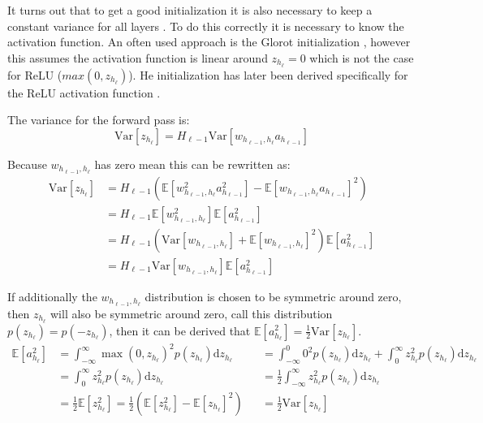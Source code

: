 It turns out that to get a good initialization it is also necessary to keep a constant variance for all layers \cite{glorot-initialization, he-initialization}. To do this correctly it is necessary to know the activation function. An often used approach is the Glorot initialization \cite{glorot-initialization}, however this assumes the activation function is linear around $z_{h_\ell} = 0$ which is not the case for ReLU ($max(0, z_{h_{\ell}})$). He initialization has later been derived specifically for the ReLU activation function \cite{he-initialization}.

The variance for the forward pass is:
\begin{equation}
\mathrm{Var}[z_{h_\ell}] = H_{\ell-1} \mathrm{Var}[w_{h_{\ell-1}, h_{\ell}} a_{h_{\ell-1}}]
\end{equation}

Because $w_{h_{\ell-1}, h_{\ell}}$ has zero mean this can be rewritten as:
\begin{equation}
\begin{aligned}
\mathrm{Var}[z_{h_\ell}]
&= H_{\ell-1} \left( \mathbb{E}[w_{h_{\ell-1}, h_{\ell}}^2 a_{h_{\ell-1}}^2] - \mathbb{E}[w_{h_{\ell-1}, h_{\ell}} a_{h_{\ell-1}}]^2 \right) \\
&= H_{\ell-1} \mathbb{E}[w_{h_{\ell-1}, h_{\ell}}^2] \mathbb{E}[a_{h_{\ell-1}}^2] \\
&= H_{\ell-1} \left(\mathrm{Var}[w_{h_{\ell-1}, h_{\ell}}] + \mathbb{E}[w_{h_{\ell-1}, h_{\ell}}]^2\right) \mathbb{E}[a_{h_{\ell-1}}^2] \\
&= H_{\ell-1} \mathrm{Var}[w_{h_{\ell-1}, h_{\ell}}] \mathbb{E}[a_{h_{\ell-1}}^2]
\end{aligned}
\end{equation}

If additionally the $w_{h_{\ell-1}, h_{\ell}}$ distribution is chosen to be symmetric around zero, then $z_{h_\ell}$ will also be symmetric around zero, call this distribution $p(z_{h_\ell}) = p(-z_{h_\ell})$, then it can be derived that $\mathbb{E}[a_{h_\ell}^2] = \frac{1}{2} \mathrm{Var}[z_{h_\ell}]$.
\begin{equation*}
\begin{aligned}
\mathbb{E}[a_{h_\ell}^2] &= \int_{-\infty}^\infty \max(0,z_{h_\ell})^2 p(z_{h_\ell}) \mathrm{d}z_{h_\ell}
&&= \int_{-\infty}^0 0^2 p(z_{h_\ell}) \mathrm{d}z_{h_\ell}
 + \int_{0}^\infty z_{h_\ell}^2 p(z_{h_\ell}) \mathrm{d}z_{h_\ell} \\
&= \int_{0}^\infty z_{h_\ell}^2 p(z_{h_\ell}) \mathrm{d}z_{h_\ell}
&&= \frac{1}{2} \int_{-\infty}^\infty z_{h_\ell}^2 p(z_{h_\ell}) \mathrm{d}z_{h_\ell} \\
&= \frac{1}{2} \mathbb{E}[z_{h_\ell}^2] = \frac{1}{2} \left(\mathbb{E}[z_{h_\ell}^2] - \mathbb{E}[z_{h_\ell}]^2\right) &&= \frac{1}{2} \mathrm{Var}[z_{h_\ell}]
\end{aligned}
\end{equation*}

